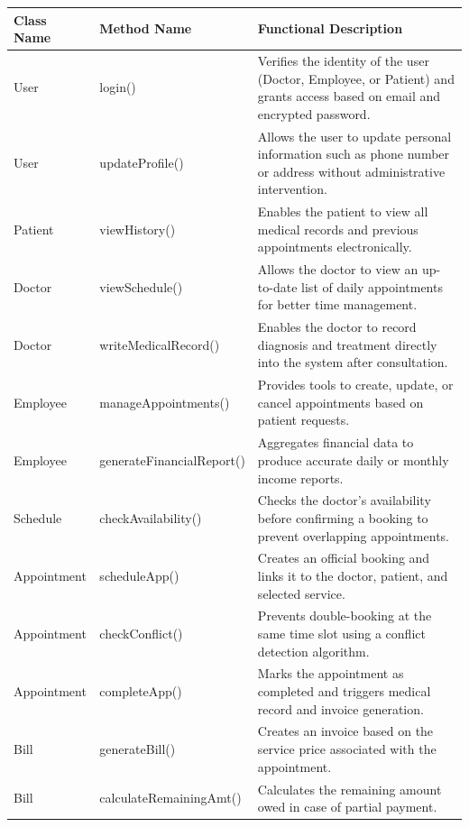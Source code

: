 \begin{table}[H]
	\centering
	\small
	\renewcommand{\arraystretch}{1.4}
	\begin{tabularx}{\textwidth}{l l X}
		\toprule
		\rowcolor[gray]{0.9} \textbf{Class Name} & \textbf{Method Name} & \textbf{Functional Description} \\
		\midrule
		
		User & login() & Verifies the identity of the user (Doctor, Employee, or Patient) and grants access based on email and encrypted password. \\
		User & updateProfile() & Allows the user to update personal information such as phone number or address without administrative intervention. \\
		
		Patient & viewHistory() & Enables the patient to view all medical records and previous appointments electronically. \\
		
		Doctor & viewSchedule() & Allows the doctor to view an up-to-date list of daily appointments for better time management. \\
		Doctor & writeMedicalRecord() & Enables the doctor to record diagnosis and treatment directly into the system after consultation. \\
		
		Employee & manageAppointments() & Provides tools to create, update, or cancel appointments based on patient requests. \\
		Employee & generateFinancialReport() & Aggregates financial data to produce accurate daily or monthly income reports. \\
		
		Schedule & checkAvailability() & Checks the doctor's availability before confirming a booking to prevent overlapping appointments. \\
		
		Appointment & scheduleApp() & Creates an official booking and links it to the doctor, patient, and selected service. \\
		Appointment & checkConflict() & Prevents double-booking at the same time slot using a conflict detection algorithm. \\
		Appointment & completeApp() & Marks the appointment as completed and triggers medical record and invoice generation. \\
		
		Bill & generateBill() & Creates an invoice based on the service price associated with the appointment. \\
		Bill & calculateRemainingAmt() & Calculates the remaining amount owed in case of partial payment. \\
		

\end{tabularx}
\end{table}
